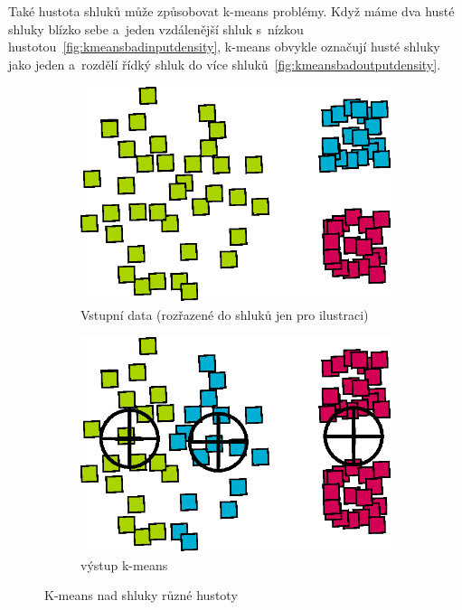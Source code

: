 Také hustota shluků může způsobovat k-means problémy. Když máme dva husté shluky blízko sebe a~jeden vzdálenější shluk s~nízkou hustotou~\autoref{fig:kmeansbadinputdensity}, k-means obvykle označují husté shluky jako jeden a~rozdělí řídký shluk do více shluků~\autoref{fig:kmeansbadoutputdensity}.
\begin{figure}[h]
\begin{subfigure}{.49\textwidth}
  \centering
  \includegraphics[width=.5\linewidth]{img/kmeans_badInputSampleDensity.eps}
  \caption{Vstupní data (rozřazené do shluků jen pro ilustraci)}
  \label{fig:kmeansbadinputdensity}
\end{subfigure}
\begin{subfigure}{.49\textwidth}
  \centering
  \includegraphics[width=.5\linewidth]{img/kmeans_badOutputSampleDensity.eps}
  \caption{výstup k-means}
  \label{fig:kmeansbadoutputdensity}
\end{subfigure}
\caption{K-means nad shluky různé hustoty}
\end{figure}

